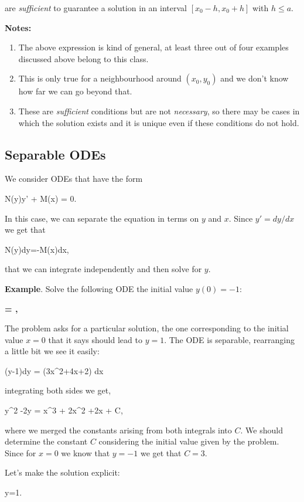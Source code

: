 are {\em sufficient} to guarantee a solution in an interval $[x_0-h,x_0+h]$ with $h\leq a$.

{\bf Notes:}
\begin{enumerate}
	\item  The above expression is kind of general, at least three out of four examples discussed above belong to this class.
	\item This is only true for a neighbourhood around $(x_0,y_0)$ and we don't know how far we can go beyond that.
	\item These are {\em sufficient} conditions but are not {\em necessary}, so there may be cases in which the solution exists and it is unique even if these conditions do not hold.
\end{enumerate}


\subsection{Separable ODEs}

We consider ODEs that have the form

\bnn N(y)y' + M(x) = 0. \enn

In this case, we can separate the equation in terms on $y$ and $x$. Since $y'=dy/dx$ we get that

\bnn N(y)dy=-M(x)dx, \enn

that we can integrate independently and then solve for $y$.

{\bf Example}. Solve the following ODE the initial value $y(0)=-1$: 

{\bf \bnn {} = , \enn }

The problem asks for a particular solution, the one corresponding to the initial value $x=0$ that it says should lead to $y=1$. The ODE is separable, rearranging a little bit we see it easily:

(y-1)dy = (3x^2+4x+2) dx \enn

integrating both sides we get,

\bnn y^2 -2y = x^3 + 2x^2 +2x + C, \enn

where we merged the constants arising from both integrals into $C$. We should determine the
constant $C$ considering the initial value given by the problem. Since for $x=0$ we know that $y=-1$ we get that $C=3$.

Let's make the solution explicit:

\bnn y=1\pm{}. \enn


